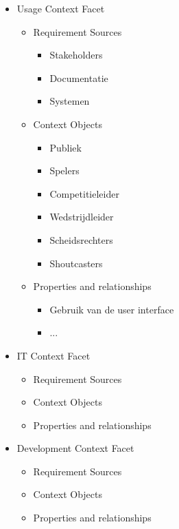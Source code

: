 \documentclass[12pt,a4paper]{article}
\begin{document}
\begin{itemize}
			\item Usage Context Facet
			\begin{itemize}
				\item Requirement Sources
				\begin{itemize}
					\item Stakeholders
					\item Documentatie
					\item Systemen
				\end{itemize}
				\item Context Objects
				\begin{itemize}
					\item Publiek
					\item Spelers
					\item Competitieleider
					\item Wedstrijdleider
					\item Scheidsrechters
					\item Shoutcasters
				\end{itemize}
				\item Properties and relationships
				\begin{itemize}
					\item Gebruik van de user interface
					\item ...
				\end{itemize}
			\end{itemize}
			\item IT Context Facet
			\begin{itemize}
				\item Requirement Sources
				\item Context Objects
				\item Properties and relationships
			\end{itemize}
			\item Development Context Facet
			\begin{itemize}
				\item Requirement Sources
				\item Context Objects
				\item Properties and relationships
			\end{itemize}
		\end{itemize}
\end{document}
